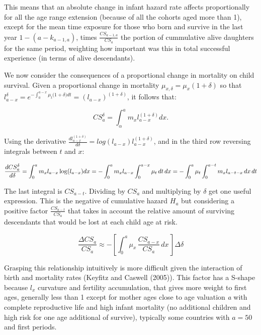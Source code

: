 \documentclass[
]{article}
\begin{document}
This means that an absolute change in infant hazard rate affects
proportionally for all the age range extension (because of all the
cohorts aged more than 1), except for the mean time exposure for those
who born and survive in the last year \(1-(a-k_{a-1,a})\), times
\(\frac{CS_{a-1,a}}{CS_a}\) the portion of cummulative alive daughters
for the same period, weighting how important was this in total
successful experience (in terms of alive descendants).

We now consider the consequences of a proportional change in mortality
on child survival. Given a proportional change in mortality
\(\mu_{x,\delta}=\mu_{x}(1+\delta)\) so that
\(l_{a-x}^\delta = e^{-\int_{0}^{a-x}{\mu_t(1+\delta})dt}=(l_{a-x})^{(1+\delta)}\),
it follows that:

\[CS_{a}^\delta = \int_{\alpha}^{a} {m_{x} l_{a-x}^{(1+\delta)}} dx.\]

Using the derivative
\(\frac{dl_{a-x}^{(1+\delta)}}{d\delta} = log(l_{a-x}) l_{a-x}^{(1+\delta)}\),
and in the third row reversing integrals between \(t\) and \(x\):

\[\frac{d CS_{a}^\delta}{d \delta} = \int_{0}^{a} {m_{x} l_{a-x} \log(l_{a-x}) dx}\\
= - \int_{0}^{a} {m_{x} l_{a-x} \int_{0}^{a-x}{\mu_t \, dt}\, dx}\\
= - \int_{0}^{a}{\mu_t} \int_{0}^{a-t} {m_{x} l_{a-t-x} \, dx}\, dt\]

The last integral is \(CS_{a-t}\). Dividing by \(CS_a\) and multiplying
by \(\delta\) get one useful expression. This is the negative of
cumulative hazard \(H_a\) but considering a positive factor
\(\frac{CS_{a-t}}{CS_a}\) that takes in account the relative amount of
surviving descendants that would be lost at each child age at risk.

\[\frac{\Delta CS_{a}}{CS_a} \approx - \left[\int_{0}^{a}{\mu_x  \, \frac{CS_{a-x}}{CS_a} \,dx \,}\right] \Delta \delta\]

Grasping this relationship intuitively is more difficult given the
interaction of birth and mortality rates (Keyfitz and Caswell (2005)).
This factor has a S-shape because \(l_x\) curvature and fertility
accumulation, that gives more weight to first ages, generally less than
1 except for mother ages close to age valuation \emph{a} with complete
reproductive life and high infant mortality (no additional children and
high risk for one age additional of survive), typically some countries
with \(a=50\) and first periods.\\
\end{document}
